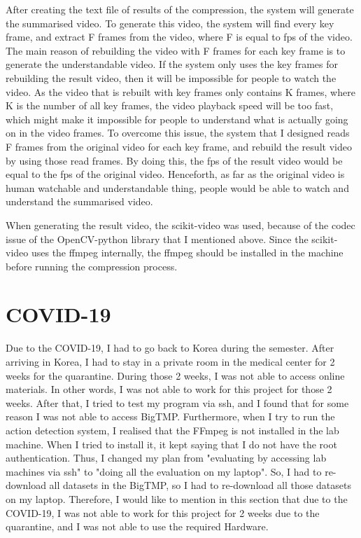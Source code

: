 \documentclass{article}
\begin{document}
After creating the text file of results of the compression, the system will generate the summarised video. To generate this video, the system will find every key frame, and extract F frames from the video, where F is equal to fps of the video. The main reason of rebuilding the video with F frames for each key frame is to generate the understandable video. If the system only uses the key frames for rebuilding the result video, then it will be impossible for people to watch the video. As the video that is rebuilt with key frames only contains K frames, where K is the number of all key frames, the video playback speed will be too fast, which might make it impossible for people to understand what is actually going on in the video frames. To overcome this issue, the system that I designed reads F frames from the original video for each key frame, and rebuild the result video by using those read frames. By doing this, the fps of the result video would be equal to the fps of the original video. Henceforth, as far as the original video is human watchable and understandable thing, people would be able to watch and understand the summarised video.

When generating the result video, the scikit-video was used, because of the codec issue of the OpenCV-python library that I mentioned above. Since the scikit-video uses the ffmpeg internally, the ffmpeg should be installed in the machine before running the compression process.


\section{COVID-19}

Due to the COVID-19, I had to go back to Korea during the semester. After arriving in Korea, I had to stay in a private room in the medical center for 2 weeks for the quarantine. During those 2 weeks, I was not able to access online materials. In other words, I was not able to work for this project for those 2 weeks. After that, I tried to test my program via ssh, and I found that for some reason I was not able to access BigTMP. Furthermore, when I try to run the action detection system, I realised that the FFmpeg is not installed in the lab machine. When I tried to install it, it kept saying that I do not have the root authentication. Thus, I changed my plan from "evaluating by accessing lab machines via ssh" to "doing all the evaluation on my laptop". So, I had to re-download all datasets in the BigTMP, so I had to re-download all those datasets on my laptop. Therefore, I would like to mention in this section that due to the COVID-19, I was not able to work for this project for 2 weeks due to the quarantine, and I was not able to use the required Hardware.
\end{document}
